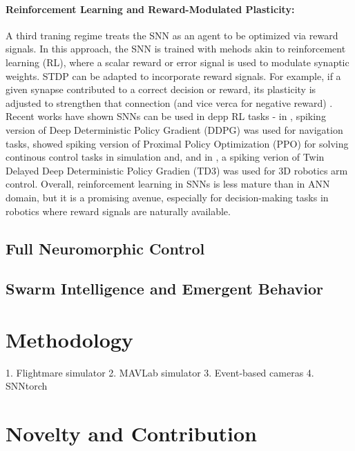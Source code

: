 \documentclass{article}
\begin{document}
\paragraph{Reinforcement Learning and Reward-Modulated Plasticity:} A third traning regime treats the SNN as an agent to be optimized via reward signals. In this approach, the SNN is trained with mehods akin to reinforcement learning (RL), where a scalar reward or error signal is used to modulate synaptic weights. STDP can be adapted to incorporate reward signals. For example, if a given synapse contributed to a correct decision or reward, its plasticity is adjusted to strengthen that connection (and vice verca for negative reward) \cite{yamazakiSpikingNeuralNetworks2022}. Recent works have shown SNNs can be used in depp RL tasks - in \cite{tangReinforcementCoLearningDeep2020}, spiking version of Deep Deterministic Policy Gradient (DDPG) was used for navigation tasks, \cite{zanattaExploringSpikingNeural2024a} showed spiking version of Proximal Policy Optimization (PPO) for solving continous control tasks in simulation
and, and in \cite{parkDesigningSpikingNeural2025}, a spiking verion of Twin Delayed Deep Deterministic Policy Gradien (TD3) was used for 3D robotics arm control. Overall, reinforcement learning in SNNs is less mature than in ANN domain, but it is a promising avenue, especially for decision-making tasks in robotics where reward signals are naturally available.


\subsection{Full Neuromorphic Control}
\subsection{Swarm Intelligence and Emergent Behavior}

\section{Methodology}

1. Flightmare simulator
2. MAVLab simulator
3. Event-based cameras
4. SNNtorch


\section{Novelty and Contribution}

\printbibliography[title={\section{References}}, sorting=none]
\end{document}
